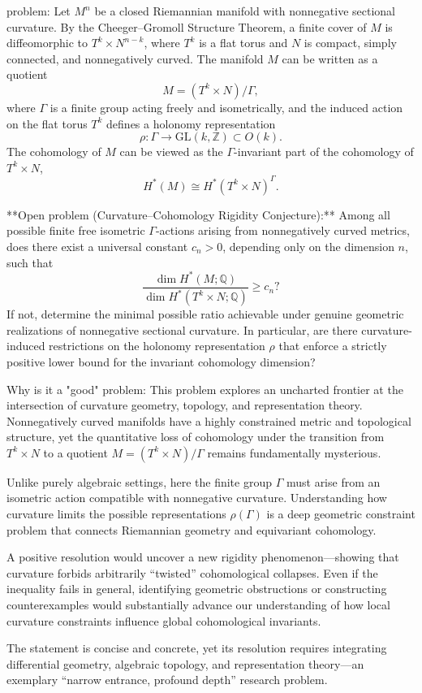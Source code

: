 problem:  
Let \(M^n\) be a closed Riemannian manifold with nonnegative sectional curvature.  
By the Cheeger–Gromoll Structure Theorem, a finite cover of \(M\) is diffeomorphic to \(T^k \times N^{n-k}\), where \(T^k\) is a flat torus and \(N\) is compact, simply connected, and nonnegatively curved. The manifold \(M\) can be written as a quotient
\[
M = (T^k \times N)/\Gamma,
\]
where \(\Gamma\) is a finite group acting freely and isometrically, and the induced action on the flat torus \(T^k\) defines a holonomy representation  
\[
\rho: \Gamma \to \mathrm{GL}(k, \mathbb{Z}) \subset O(k).
\]  
The cohomology of \(M\) can be viewed as the \(\Gamma\)-invariant part of the cohomology of \(T^k \times N\),
\[
H^*(M) \cong H^*(T^k \times N)^\Gamma.
\]  

**Open problem (Curvature–Cohomology Rigidity Conjecture):**  
Among all possible finite free isometric \(\Gamma\)-actions arising from nonnegatively curved metrics, does there exist a universal constant \(c_n>0\), depending only on the dimension \(n\), such that  
\[
\frac{\dim H^*(M; \mathbb{Q})}{\dim H^*(T^k \times N; \mathbb{Q})} \ge c_n?
\]  
If not, determine the minimal possible ratio achievable under genuine geometric realizations of nonnegative sectional curvature. In particular, are there curvature-induced restrictions on the holonomy representation \(\rho\) that enforce a strictly positive lower bound for the invariant cohomology dimension?

Why is it a "good" problem:  
This problem explores an uncharted frontier at the intersection of curvature geometry, topology, and representation theory. Nonnegatively curved manifolds have a highly constrained metric and topological structure, yet the quantitative loss of cohomology under the transition from \(T^k \times N\) to a quotient \(M = (T^k \times N)/\Gamma\) remains fundamentally mysterious.  

Unlike purely algebraic settings, here the finite group \(\Gamma\) must arise from an isometric action compatible with nonnegative curvature. Understanding how curvature limits the possible representations \(\rho(\Gamma)\) is a deep geometric constraint problem that connects Riemannian geometry and equivariant cohomology.  

A positive resolution would uncover a new rigidity phenomenon—showing that curvature forbids arbitrarily “twisted” cohomological collapses. Even if the inequality fails in general, identifying geometric obstructions or constructing counterexamples would substantially advance our understanding of how local curvature constraints influence global cohomological invariants.  

The statement is concise and concrete, yet its resolution requires integrating differential geometry, algebraic topology, and representation theory—an exemplary “narrow entrance, profound depth” research problem.